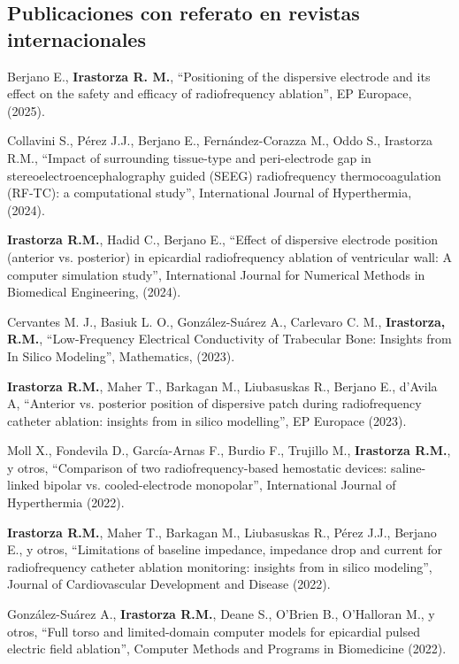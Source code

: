 \documentclass[margin,line]{res}
\begin{document}
\begin{resume}
\subsection{ Publicaciones con referato en revistas internacionales}

Berjano E., {\bf Irastorza R. M.}, ``Positioning of the dispersive electrode and its effect on the safety and efficacy of radiofrequency ablation'', EP Europace, (2025).

Collavini S., Pérez J.J., Berjano E., Fernández-Corazza M., Oddo S., {Irastorza R.M.},
``Impact of surrounding tissue-type and peri-electrode gap in stereoelectroencephalography guided (SEEG) radiofrequency thermocoagulation (RF-TC): a computational study'', International Journal of Hyperthermia, (2024).

{\bf Irastorza R.M.}, Hadid C., Berjano E., ``Effect of dispersive electrode position (anterior vs. posterior) in epicardial radiofrequency ablation of ventricular wall: A computer simulation study'', International Journal for Numerical Methods in Biomedical Engineering, (2024).

Cervantes M. J., Basiuk L. O., González-Suárez A., Carlevaro C. M., \textbf{Irastorza, R.M.}, ``Low-Frequency Electrical Conductivity of Trabecular Bone: Insights from In Silico Modeling'', Mathematics, (2023).

\textbf{Irastorza R.M.}, Maher T., Barkagan M., Liubasuskas R., Berjano E., d’Avila A, ``Anterior vs. posterior position of dispersive patch during radiofrequency catheter ablation: insights from in silico modelling'', EP Europace (2023).

Moll X., Fondevila D., García-Arnas F., Burdio F., Trujillo M., \textbf{Irastorza R.M.}, y otros, ``Comparison of two radiofrequency-based hemostatic devices: saline-linked bipolar vs. cooled-electrode monopolar'', International Journal of Hyperthermia (2022).

\textbf{Irastorza R.M.}, Maher T., Barkagan M., Liubasuskas R., Pérez J.J., Berjano E., y otros, ``Limitations of baseline impedance, impedance drop and current for radiofrequency catheter ablation monitoring: insights from in silico modeling'', Journal of Cardiovascular Development and Disease (2022).

González-Suárez A., \textbf{Irastorza R.M.}, Deane S., O'Brien B., O'Halloran M., y otros, ``Full torso and limited-domain computer models for epicardial pulsed electric field ablation'', Computer Methods and Programs in Biomedicine (2022).


\end{resume}
\end{document}
